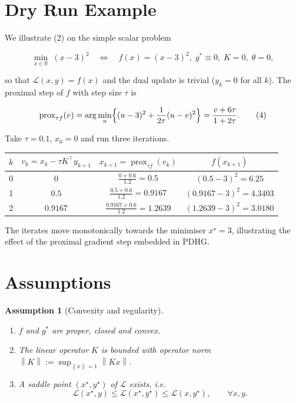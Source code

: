 \documentclass{article}
\newtheorem{assumption}{Assumption}
\newcommand{\prox}[2]{\operatorname{prox}_{#1}\!\left(#2\right)}
\newcommand{\norm}[1]{\left\|#1\right\|}
\begin{document}
\section*{Dry Run Example}
We illustrate (2) on the simple scalar problem  

\[
\min_{x\in\mathbb R}\;(x-3)^{2}\quad\Longleftrightarrow\quad
f(x)=(x-3)^{2},\;g^{*}\equiv0,\;K=0,\;\theta=0,
\]

so that $\mathcal L(x,y)=f(x)$ and the dual update is trivial ($y_{k}=0$ for all $k$).  
The proximal step of $f$ with step size $\tau$ is  

\[
\prox{\tau f}{v}
= \arg\min_{u}\Bigl\{(u-3)^{2}+\frac{1}{2\tau}(u-v)^{2}\Bigr\}
= \frac{v+6\tau}{1+2\tau}.
\tag{4}
\]

Take $\tau=0.1$, $x_{0}=0$ and run three iterations.

\begin{center}
\begin{tabular}{c|c|c|c}
$k$ & $v_{k}=x_{k}-\tau K^{\!\top}y_{k+1}$ & $x_{k+1}=\prox{\tau f}{v_{k}}$ & $f(x_{k+1})$\\ \hline
0 & $0$ & $\displaystyle\frac{0+0.6}{1.2}=0.5$ & $(0.5-3)^{2}=6.25$\\
1 & $0.5$ & $\displaystyle\frac{0.5+0.6}{1.2}=0.9167$ & $(0.9167-3)^{2}=4.3403$\\
2 & $0.9167$ & $\displaystyle\frac{0.9167+0.6}{1.2}=1.2639$ & $(1.2639-3)^{2}=3.0180$
\end{tabular}
\end{center}

The iterates move monotonically towards the minimiser $x^{\star}=3$, illustrating the effect of the proximal gradient step embedded in PDHG.

\newpage
\section*{Assumptions}
\begin{assumption}[Convexity and regularity]\label{ass:convex}
\begin{enumerate}[label=(\alph*)]
\item $f$ and $g^{*}$ are proper, closed and convex.
\item The linear operator $K$ is bounded with operator norm $\norm{K}:=\sup_{\norm{x}=1}\norm{Kx}$.
\item A saddle point $(x^{\star},y^{\star})$ of $\mathcal L$ exists, i.e.
\[
\mathcal L(x^{\star},y)\le\mathcal L(x^{\star},y^{\star})\le\mathcal L(x,y^{\star}),\qquad\forall x,y.
\]
\end{enumerate}
\end{assumption}
\end{document}

